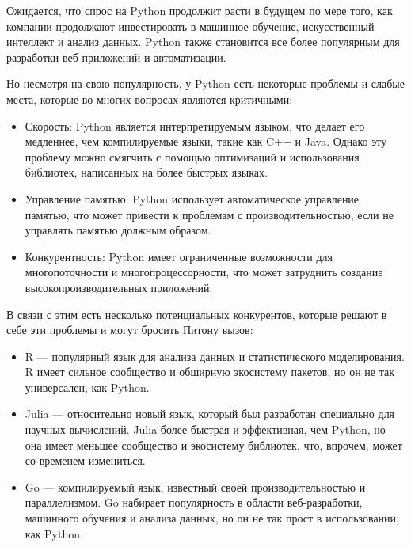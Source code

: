 Ожидается, что спрос на Python продолжит расти в будущем по мере того, как компании продолжают инвестировать в машинное обучение, искусственный интеллект и анализ данных. Python также становится все более популярным для разработки веб-приложений и автоматизации.

Но несмотря на свою популярность, у Python есть некоторые проблемы и слабые места, которые во многих вопросах являются критичными:
\begin{itemize}
    \item Скорость: Python является интерпретируемым языком, что делает его медленнее, чем компилируемые языки, такие как C++ и Java. Однако эту проблему можно смягчить с помощью оптимизаций и использования библиотек, написанных на более быстрых языках.
    \item Управление памятью: Python использует автоматическое управление памятью, что может привести к проблемам с производительностью, если не управлять памятью должным образом.
    \item Конкурентность: Python имеет ограниченные возможности для многопоточности и многопроцессорности, что может затруднить создание высокопроизводительных приложений.
\end{itemize}

В связи с этим есть несколько потенциальных конкурентов, которые решают в себе эти проблемы и могут бросить Питону вызов:
\begin{itemize}
    \item R --- популярный язык для анализа данных и статистического моделирования. R имеет сильное сообщество и обширную экосистему пакетов, но он не так универсален, как Python.
    \item Julia --- относительно новый язык, который был разработан специально для научных вычислений. Julia более быстрая и эффективная, чем Python, но она имеет меньшее сообщество и экосистему библиотек, что, впрочем, может со временем измениться.
    \item Go --- компилируемый язык, известный своей производительностью и параллелизмом. Go набирает популярность в области веб-разработки, машинного обучения и анализа данных, но он не так прост в использовании, как Python.
\end{itemize}